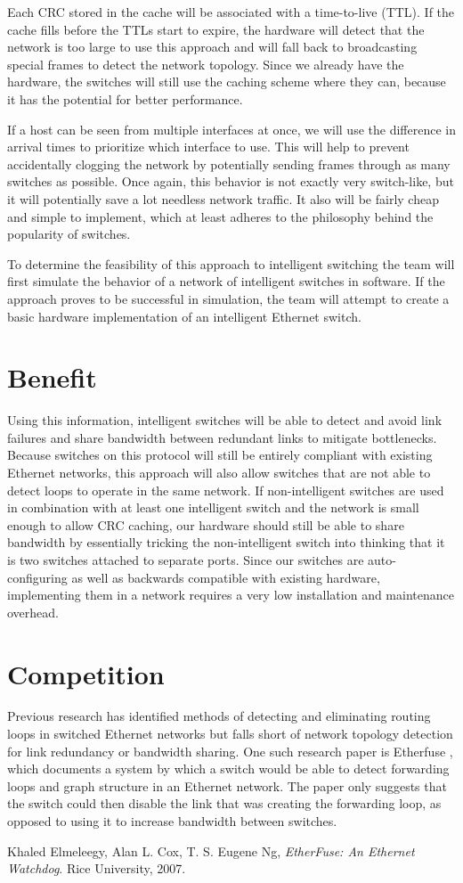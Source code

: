 \documentclass{article}
\begin{document}
	Each CRC stored in the cache will be associated with a time-to-live (TTL).
	If the cache fills before the TTLs start to expire, the hardware will detect that the network is too large to use this approach and will fall back to broadcasting special frames to detect the network topology.
        Since we already have the hardware, the switches will still use the caching scheme where they can, because it has the potential for better performance.

	If a host can be seen from multiple interfaces at once, we will use the difference in arrival times to prioritize which interface to use. 
	This will help to prevent accidentally clogging the network by potentially sending frames through as many switches as possible. Once again, this behavior is not exactly very switch-like, but it will potentially save a lot needless network traffic. 
	It also will be fairly cheap and simple to implement, which at least adheres to the philosophy behind the popularity of switches.

	To determine the feasibility of this approach to intelligent switching the team will first simulate the behavior of a network of intelligent switches in software.
	If the approach proves to be successful in simulation, the team will attempt to create a basic hardware implementation of an intelligent Ethernet switch.
\section{Benefit}
	Using this information, intelligent switches will be able to detect and avoid link failures and share bandwidth between redundant links to mitigate bottlenecks.
	Because switches on this protocol will still be entirely compliant with existing Ethernet networks, this approach will also allow switches that are not able to detect loops to operate in the same network.
	If non-intelligent switches are used in combination with at least one intelligent switch and the network is small enough to allow CRC caching, our hardware should still be able to share bandwidth by essentially tricking the non-intelligent switch into thinking that it is two switches attached to separate ports.
	Since our switches are auto-configuring as well as backwards compatible with existing hardware, implementing them in a network requires a very low installation and maintenance overhead.
\section{Competition}
	Previous research has identified methods of detecting and eliminating routing loops in switched Ethernet networks but falls short of network topology detection for link redundancy or bandwidth sharing.
	One such research paper is Etherfuse \cite{etherfuse}, which documents a system by which a switch would be able to detect forwarding loops and graph structure in an Ethernet network.
	The paper only suggests that the switch could then disable the link that was creating the forwarding loop, as opposed to using it to increase bandwidth between switches.
	
\begin{thebibliography}{9}
	Khaled Elmeleegy, Alan L. Cox, T. S. Eugene Ng,
	\emph{EtherFuse: An Ethernet Watchdog}.
	Rice University, 2007.
\end{thebibliography}
\end{document}
